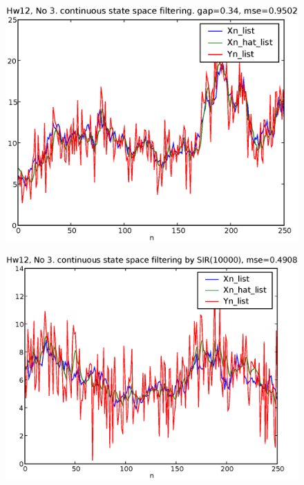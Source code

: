 \documentclass[a4paper,10pt]{article}
\begin{document}
\begin{figure}
\includegraphics[width=1\textwidth]{hw12_3_gap_0_34.eps}
\caption{}\label{f2}
\end{figure}

\begin{figure}
\includegraphics[width=1\textwidth]{hw12_3_SIR_10000.eps}
\caption{}\label{f3}
\end{figure}
\end{document}
